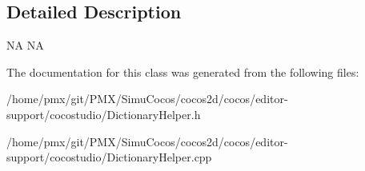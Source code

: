 \subsection{Detailed Description}
NA  NA 

The documentation for this class was generated from the following files\+:\begin{DoxyCompactItemize}
\item 
/home/pmx/git/\+P\+M\+X/\+Simu\+Cocos/cocos2d/cocos/editor-\/support/cocostudio/Dictionary\+Helper.\+h\item 
/home/pmx/git/\+P\+M\+X/\+Simu\+Cocos/cocos2d/cocos/editor-\/support/cocostudio/Dictionary\+Helper.\+cpp\end{DoxyCompactItemize}
